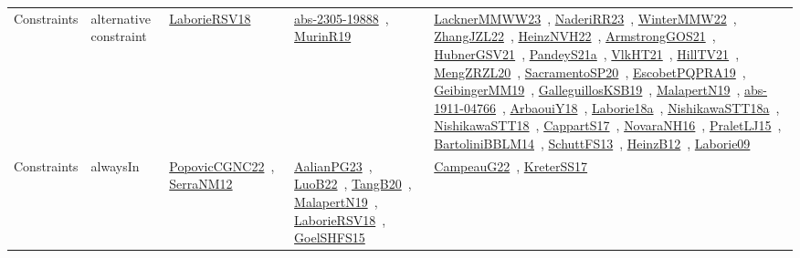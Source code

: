 {\begin{longtable}{lp{3cm}>{\raggedright\arraybackslash}p{6cm}>{\raggedright\arraybackslash}p{6cm}>{\raggedright\arraybackslash}p{8cm}}
Constraints & alternative constraint & \href{articles/LaborieRSV18.pdf}{LaborieRSV18}~\cite{LaborieRSV18} & \href{articles/abs-2305-19888.pdf}{abs-2305-19888}~\cite{abs-2305-19888}, \href{papers/MurinR19.pdf}{MurinR19}~\cite{MurinR19} & \href{articles/LacknerMMWW23.pdf}{LacknerMMWW23}~\cite{LacknerMMWW23}, \href{articles/NaderiRR23.pdf}{NaderiRR23}~\cite{NaderiRR23}, \href{papers/WinterMMW22.pdf}{WinterMMW22}~\cite{WinterMMW22}, \href{papers/ZhangJZL22.pdf}{ZhangJZL22}~\cite{ZhangJZL22}, \href{articles/HeinzNVH22.pdf}{HeinzNVH22}~\cite{HeinzNVH22}, \href{papers/ArmstrongGOS21.pdf}{ArmstrongGOS21}~\cite{ArmstrongGOS21}, \href{articles/HubnerGSV21.pdf}{HubnerGSV21}~\cite{HubnerGSV21}, \href{articles/PandeyS21a.pdf}{PandeyS21a}~\cite{PandeyS21a}, \href{articles/VlkHT21.pdf}{VlkHT21}~\cite{VlkHT21}, \href{papers/HillTV21.pdf}{HillTV21}~\cite{HillTV21}, \href{articles/MengZRZL20.pdf}{MengZRZL20}~\cite{MengZRZL20}, \href{articles/SacramentoSP20.pdf}{SacramentoSP20}~\cite{SacramentoSP20}, \href{articles/EscobetPQPRA19.pdf}{EscobetPQPRA19}~\cite{EscobetPQPRA19}, \href{papers/GeibingerMM19.pdf}{GeibingerMM19}~\cite{GeibingerMM19}, \href{papers/GalleguillosKSB19.pdf}{GalleguillosKSB19}~\cite{GalleguillosKSB19}, \href{papers/MalapertN19.pdf}{MalapertN19}~\cite{MalapertN19}, \href{articles/abs-1911-04766.pdf}{abs-1911-04766}~\cite{abs-1911-04766}, \href{papers/ArbaouiY18.pdf}{ArbaouiY18}~\cite{ArbaouiY18}, \href{papers/Laborie18a.pdf}{Laborie18a}~\cite{Laborie18a}, \href{papers/NishikawaSTT18a.pdf}{NishikawaSTT18a}~\cite{NishikawaSTT18a}, \href{papers/NishikawaSTT18.pdf}{NishikawaSTT18}~\cite{NishikawaSTT18}, \href{papers/CappartS17.pdf}{CappartS17}~\cite{CappartS17}, \href{articles/NovaraNH16.pdf}{NovaraNH16}~\cite{NovaraNH16}, \href{papers/PraletLJ15.pdf}{PraletLJ15}~\cite{PraletLJ15}, \href{papers/BartoliniBBLM14.pdf}{BartoliniBBLM14}~\cite{BartoliniBBLM14}, \href{papers/SchuttFS13.pdf}{SchuttFS13}~\cite{SchuttFS13}, \href{papers/HeinzB12.pdf}{HeinzB12}~\cite{HeinzB12}, \href{papers/Laborie09.pdf}{Laborie09}~\cite{Laborie09}\\
Constraints & alwaysIn & \href{papers/PopovicCGNC22.pdf}{PopovicCGNC22}~\cite{PopovicCGNC22}, \href{papers/SerraNM12.pdf}{SerraNM12}~\cite{SerraNM12} & \href{papers/AalianPG23.pdf}{AalianPG23}~\cite{AalianPG23}, \href{papers/LuoB22.pdf}{LuoB22}~\cite{LuoB22}, \href{papers/TangB20.pdf}{TangB20}~\cite{TangB20}, \href{papers/MalapertN19.pdf}{MalapertN19}~\cite{MalapertN19}, \href{articles/LaborieRSV18.pdf}{LaborieRSV18}~\cite{LaborieRSV18}, \href{articles/GoelSHFS15.pdf}{GoelSHFS15}~\cite{GoelSHFS15} & \href{articles/CampeauG22.pdf}{CampeauG22}~\cite{CampeauG22}, \href{articles/KreterSS17.pdf}{KreterSS17}~\cite{KreterSS17}\\

\end{longtable}}
